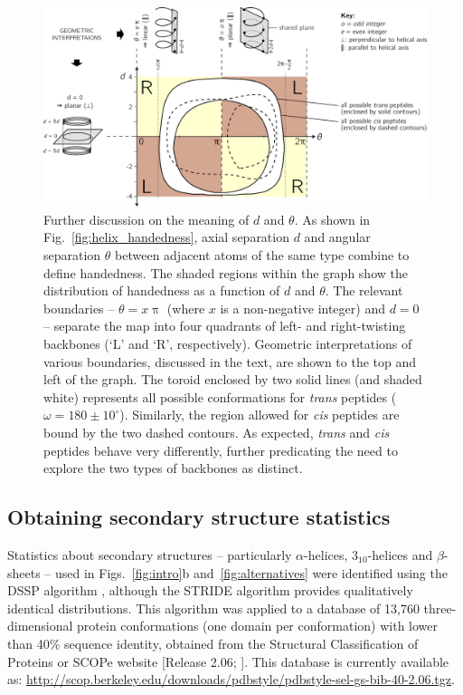 \documentclass[fleqn,10pt,lineno]{wlpeerj} %
\newcommand{\n}[1]{{\color{blue}#1}}
\newcommand{\Fig}[1]{Fig.~\ref{#1}}
\newcommand{\Figs}[1]{Figs.~\ref{#1}}
\newcommand{\cis}{{\em cis}\xspace}
\newcommand{\trans}{{\em trans}\xspace}
\begin{document}
\begin{figure}[t!]
\centering
\includegraphics[width=0.85\linewidth]{./figures/dtheta_full3.pdf}
\caption{\label{fig:d_vs_theta} \n{Further discussion on the meaning of $d$ and $\theta$. As shown in \Fig{fig:helix_handedness}, axial separation $d$ and angular separation $\theta$ between adjacent atoms of the same type combine to define handedness. The shaded regions within the graph show the distribution of handedness as a function of $d$ and $\theta$. The relevant boundaries -- $\theta=x\uppi$ (where $x$ is a non-negative integer) and $d=0$ -- separate the map into four quadrants of left- and right-twisting backbones (`L' and `R', respectively). Geometric interpretations of various boundaries, discussed in the text, are shown to the top and left of the graph. The toroid enclosed by two solid lines (and shaded white) represents all possible conformations for \trans peptides ($\omega=180 \pm 10^\circ$). Similarly, the region allowed for \cis peptides are bound by the two dashed contours. As expected, \trans and \cis peptides behave very differently, further predicating the need to explore the two types of backbones as distinct.
} 
}
\end{figure}

\n{
\subsection*{Obtaining secondary structure statistics}
Statistics about secondary structures -- particularly $\alpha$-helices, $3_{10}$-helices and $\beta$-sheets -- used in \Figs{fig:intro}b and~\ref{fig:alternatives} were identified using the DSSP algorithm \citep{Kabsch1983}, although the STRIDE algorithm \citep{Frishman1995} provides qualitatively identical distributions. This algorithm was applied to a database of 13,760 three-dimensional protein conformations (one domain per conformation) with lower than 40\% sequence identity, obtained from the Structural Classification of Proteins or SCOPe website [Release 2.06; \cite{Fox2014}]. This database is currently available as: \url{http://scop.berkeley.edu/downloads/pdbstyle/pdbstyle-sel-gs-bib-40-2.06.tgz}.}
\end{document}
